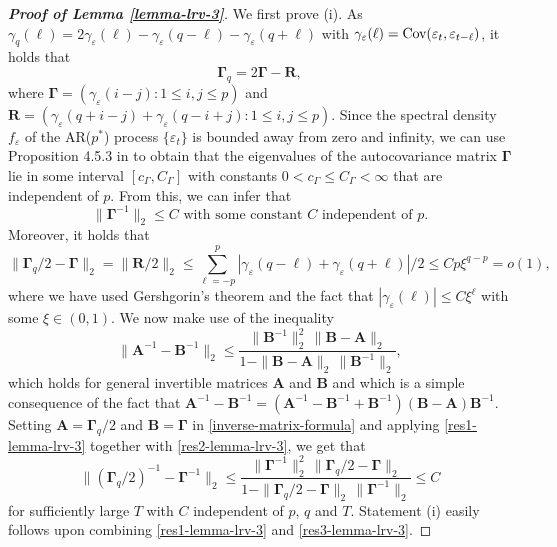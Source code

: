 \begin{proof}[\textnormal{\textbf{Proof of Lemma \ref{lemma-lrv-3}}}] 
We first prove (i). As $\gamma_q(\ell) = 2 \gamma_{\varepsilon}(\ell) - \gamma_{\varepsilon}(q-\ell) - \gamma_{\varepsilon}(q+\ell)$ with $\gamma_{\varepsilon}(\ell) = \textnormal{Cov}(\varepsilon_t,\varepsilon_{t-\ell})$, it holds that 
\[ \boldsymbol{\Gamma}_q = 2\boldsymbol{\Gamma} - \boldsymbol{R}, \]
where $\boldsymbol{\Gamma} = (\gamma_{\varepsilon}(i-j): 1 \le i,j \le p)$ and $\boldsymbol{R} = (\gamma_{\varepsilon}(q+i-j) + \gamma_{\varepsilon}(q-i+j): 1 \le i,j \le p)$. Since the spectral density $f_{\varepsilon}$ of the AR($p^*$) process $\{\varepsilon_t\}$ is bounded away from zero and infinity, we can use Proposition 4.5.3 in \cite{BrockwellDavis1991} to obtain that the eigenvalues of the autocovariance matrix $\boldsymbol{\Gamma}$ lie in some interval $[c_{\Gamma},C_{\Gamma}]$ with constants $0 < c_{\Gamma} \le C_{\Gamma} < \infty$ that are independent of $p$. From this, we can infer that 
\begin{equation}\label{res1-lemma-lrv-3}
\| \boldsymbol{\Gamma}^{-1} \|_2 \le C \text{  with some constant } C \text{ independent of } p. 
\end{equation}
Moreover, it holds that 
\begin{equation}\label{res2-lemma-lrv-3}
\| \boldsymbol{\Gamma}_q/2 - \boldsymbol{\Gamma} \|_2 = \| \boldsymbol{R}/2 \|_2 \le \sum\limits_{\ell=-p}^p | \gamma_{\varepsilon}(q-\ell) + \gamma_{\varepsilon}(q+\ell) |/2 \le C p \xi^{q-p} = o(1), 
\end{equation}
where we have used Gershgorin's theorem and the fact that $|\gamma_{\varepsilon}(\ell)| \le C \xi^\ell$ with some $\xi \in (0,1)$. We now make use of the inequality
\begin{equation}\label{inverse-matrix-formula}
\| \boldsymbol{A}^{-1} - \boldsymbol{B}^{-1} \|_2 \le \frac{ \| \boldsymbol{B}^{-1} \|_2^2 \, \| \boldsymbol{B} - \boldsymbol{A} \|_2 }{1  -  \| \boldsymbol{B} - \boldsymbol{A} \|_2 \, \| \boldsymbol{B}^{-1} \|_2},
\end{equation}
which holds for general invertible matrices $\boldsymbol{A}$ and $\boldsymbol{B}$ and which is a simple consequence of the fact that $\boldsymbol{A}^{-1} - \boldsymbol{B}^{-1} = (\boldsymbol{A}^{-1} - \boldsymbol{B}^{-1} + \boldsymbol{B}^{-1}) (\boldsymbol{B} - \boldsymbol{A}) \boldsymbol{B}^{-1}$. Setting $\boldsymbol{A} = \boldsymbol{\Gamma}_q/2$ and $\boldsymbol{B} = \boldsymbol{\Gamma}$ in \eqref{inverse-matrix-formula} and applying \eqref{res1-lemma-lrv-3} together with \eqref{res2-lemma-lrv-3}, we get that  
\begin{equation}\label{res3-lemma-lrv-3}
\| (\boldsymbol{\Gamma}_q/2)^{-1} - \boldsymbol{\Gamma}^{-1} \|_2 \le \frac{ \| \boldsymbol{\Gamma}^{-1} \|_2^2 \, \| \boldsymbol{\Gamma}_q/2 - \boldsymbol{\Gamma} \|_2 }{1  -  \| \boldsymbol{\Gamma}_q/2 - \boldsymbol{\Gamma} \|_2 \, \| \boldsymbol{\Gamma}^{-1} \|_2} \le C 
\end{equation}
for sufficiently large $T$ with $C$ independent of $p$, $q$ and $T$. Statement (i) easily follows upon combining \eqref{res1-lemma-lrv-3} and \eqref{res3-lemma-lrv-3}.



\end{proof}
